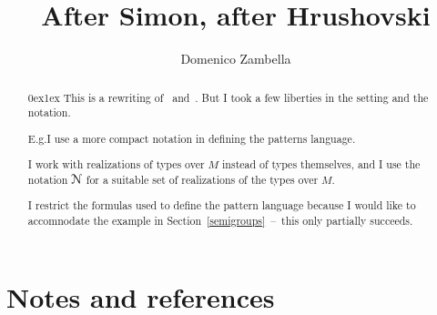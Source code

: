 \documentclass{amsproc}
\author{Domenico Zambella}
\def\N{\EuScript N}
\theoremstyle{mio}
\newcommand\branch{}
\begin{document}
\title{After Simon, after Hrushovski}
\maketitle
\raggedbottom

\begin{abstract}\parindent0ex\parskip1ex
  This is a rewriting of~\cite{Si} and~\cite{Hr}.
  But I took a few liberties in the setting and the notation.
  
  E.g.\@ I use a more compact notation in defining the patterns language.

  I work with realizations of types over $M$ instead of types themselves, and I use the notation $\N$ for a suitable set of realizations of the types over $M$.

  I restrict the formulas used to define the pattern language because I would like to accomnodate the example in Section~\ref{semigroups}~--~this only partially succeeds.
\end{abstract}

% 
% 
% 




\section{Notes and references}

\begin{biblist}[]\normalsize

\smallskip
{}\smallskip
{}\smallskip
\end{biblist}
\end{document}
